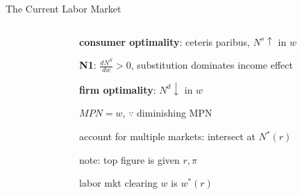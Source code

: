 \documentclass[11pt,aspectratio=169,usenames,dvipsnames]{beamer}
\let\tempone\itemize
\let\temptwo\enditemize
\renewenvironment{itemize}{\tempone\addtolength{\itemsep}{\fill}}{\temptwo}
\begin{document}
\begin{frame}{The Current Labor Market}
\begin{columns}
\begin{column}{0.5\textwidth}
\begin{tikzpicture}
            \end{tikzpicture}
        \end{column}
        \begin{column}{0.5\textwidth}
            \begin{itemize}
                \item \textbf{consumer optimality}: ceteris paribus, $ N^{s} \uparrow  $ in $ w $
                \begin{itemize}
                    \item \textbf{N1}: $ \displaystyle \frac{d N^{S}}{dw} > 0 $, substitution dominates income effect
                \end{itemize}
                \item \textbf{firm optimality}: $ N^{d} \downarrow  $ in $ w $
                \begin{itemize}
                    \item $ MPN = w $, $ \because $ diminishing MPN
                \end{itemize}
                \item account for \alert{multiple markets}: intersect at \alert{$N^{*}( r )$}
                \begin{itemize}
                    \item note: top figure is given $ r, \pi $
                    \item labor mkt clearing $ w $ is $ w^{*}( r ) $
                \end{itemize}
            \end{itemize}
        \end{column}
    \end{columns}
\end{frame}
\end{document}
